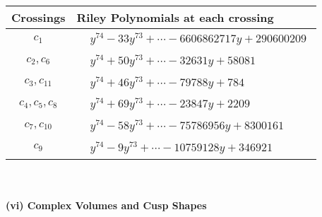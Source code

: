\documentclass[1p]{elsarticle_modified}
\theoremstyle{definition}
\begin{document}
\begin{tabular}{m{50pt}|m{274pt}}
Crossings & \hspace{64pt}Riley Polynomials at each crossing \\
\hline $$\begin{aligned}c_{1}\end{aligned}$$&$\begin{aligned}
&y^{74}-33 y^{73}+\cdots-6606862717 y+290600209
\end{aligned}$\\
\hline $$\begin{aligned}c_{2},c_{6}\end{aligned}$$&$\begin{aligned}
&y^{74}+50 y^{73}+\cdots-32631 y+58081
\end{aligned}$\\
\hline $$\begin{aligned}c_{3},c_{11}\end{aligned}$$&$\begin{aligned}
&y^{74}+46 y^{73}+\cdots-79788 y+784
\end{aligned}$\\
\hline $$\begin{aligned}c_{4},c_{5},c_{8}\end{aligned}$$&$\begin{aligned}
&y^{74}+69 y^{73}+\cdots-23847 y+2209
\end{aligned}$\\
\hline $$\begin{aligned}c_{7},c_{10}\end{aligned}$$&$\begin{aligned}
&y^{74}-58 y^{73}+\cdots-75786956 y+8300161
\end{aligned}$\\
\hline $$\begin{aligned}c_{9}\end{aligned}$$&$\begin{aligned}
&y^{74}-9 y^{73}+\cdots-10759128 y+346921
\end{aligned}$\\
\hline
\end{tabular}\\~\\
\newpage\flushleft \textbf{(vi) Complex Volumes and Cusp Shapes}
\end{document}
